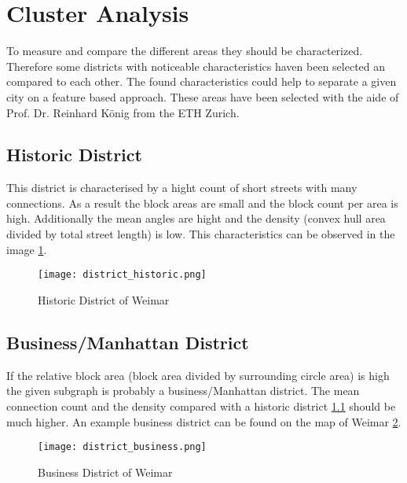 \pagebreak
\section{Cluster Analysis}
\label{sec:concept_cluster_analysis}
To measure and compare the different areas they should be characterized. Therefore some districts with noticeable characteristics haven been selected an compared to each other. The found characteristics could help to separate a given city on a feature based approach.
These areas have been selected with the aide of Prof. Dr. Reinhard König from the ETH Zurich.

\subsection{Historic District}
\label{sec:historyDistinct}
This district is characterised by a hight count of short streets with many connections. As a result the block areas are small and the block count per area is high. Additionally the mean angles are hight and the density (convex hull area divided by total street length) is low. This characteristics can be observed in the image \ref{fig:historic_district}.

\begin{figure}[!ht]
    \centering
    \begin{mdframed}[style=mdthight, userdefinedwidth=0.4\textwidth, align=center]
        \texttt{[image: district\_historic.png]}
    \end{mdframed}
    \caption{Historic District of Weimar}
    \label{fig:historic_district}
\end{figure}

\FloatBarrier
\subsection{Business/Manhattan District} 
\label{sec:businessDistinct}
If the relative block area (block area divided by surrounding circle area) is high the given subgraph is probably a business/Manhattan district. The mean connection count and the density compared with a historic district \ref{sec:historyDistinct} should be much higher. An example business district can be found on the map of Weimar \ref{fig:business_district}.

\begin{figure}[!ht]
    \centering
    \begin{mdframed}[style=mdthight, userdefinedwidth=0.4\textwidth, align=center]
        \texttt{[image: district\_business.png]}
    \end{mdframed}
    \caption{Business District of Weimar}
    \label{fig:business_district}
\end{figure}

